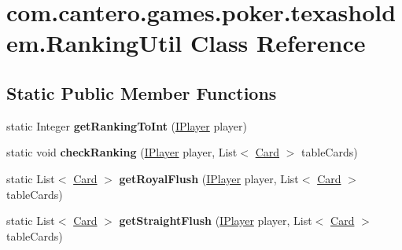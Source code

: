 \hypertarget{classcom_1_1cantero_1_1games_1_1poker_1_1texasholdem_1_1_ranking_util}{}\section{com.\+cantero.\+games.\+poker.\+texasholdem.\+Ranking\+Util Class Reference}
\label{classcom_1_1cantero_1_1games_1_1poker_1_1texasholdem_1_1_ranking_util}
\subsection*{Static Public Member Functions}
\begin{DoxyCompactItemize}
\item 
\hypertarget{classcom_1_1cantero_1_1games_1_1poker_1_1texasholdem_1_1_ranking_util_a153ca61418e411c6f3477f7be5adb63d}{}static Integer {\bfseries get\+Ranking\+To\+Int} (\hyperlink{interfacecom_1_1cantero_1_1games_1_1poker_1_1texasholdem_1_1_i_player}{I\+Player} player)\label{classcom_1_1cantero_1_1games_1_1poker_1_1texasholdem_1_1_ranking_util_a153ca61418e411c6f3477f7be5adb63d}

\item 
\hypertarget{classcom_1_1cantero_1_1games_1_1poker_1_1texasholdem_1_1_ranking_util_af0cdd411010232aeeeb4c29717cd0198}{}static void {\bfseries check\+Ranking} (\hyperlink{interfacecom_1_1cantero_1_1games_1_1poker_1_1texasholdem_1_1_i_player}{I\+Player} player, List$<$ \hyperlink{classcom_1_1cantero_1_1games_1_1poker_1_1texasholdem_1_1_card}{Card} $>$ table\+Cards)\label{classcom_1_1cantero_1_1games_1_1poker_1_1texasholdem_1_1_ranking_util_af0cdd411010232aeeeb4c29717cd0198}

\item 
\hypertarget{classcom_1_1cantero_1_1games_1_1poker_1_1texasholdem_1_1_ranking_util_a0534b131abc4539f0ba70cc30bb7e700}{}static List$<$ \hyperlink{classcom_1_1cantero_1_1games_1_1poker_1_1texasholdem_1_1_card}{Card} $>$ {\bfseries get\+Royal\+Flush} (\hyperlink{interfacecom_1_1cantero_1_1games_1_1poker_1_1texasholdem_1_1_i_player}{I\+Player} player, List$<$ \hyperlink{classcom_1_1cantero_1_1games_1_1poker_1_1texasholdem_1_1_card}{Card} $>$ table\+Cards)\label{classcom_1_1cantero_1_1games_1_1poker_1_1texasholdem_1_1_ranking_util_a0534b131abc4539f0ba70cc30bb7e700}

\item 
\hypertarget{classcom_1_1cantero_1_1games_1_1poker_1_1texasholdem_1_1_ranking_util_acd2f56cdd689742269fd428f4f920a79}{}static List$<$ \hyperlink{classcom_1_1cantero_1_1games_1_1poker_1_1texasholdem_1_1_card}{Card} $>$ {\bfseries get\+Straight\+Flush} (\hyperlink{interfacecom_1_1cantero_1_1games_1_1poker_1_1texasholdem_1_1_i_player}{I\+Player} player, List$<$ \hyperlink{classcom_1_1cantero_1_1games_1_1poker_1_1texasholdem_1_1_card}{Card} $>$ table\+Cards)\label{classcom_1_1cantero_1_1games_1_1poker_1_1texasholdem_1_1_ranking_util_acd2f56cdd689742269fd428f4f920a79}


\end{DoxyCompactItemize}
